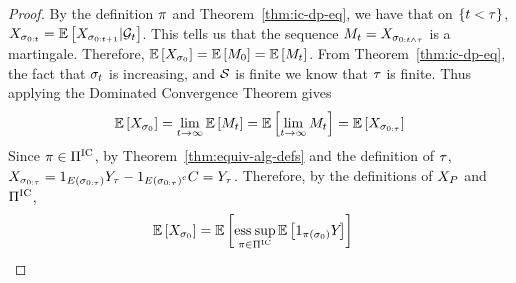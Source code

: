 \begin{proof}
    By the definition $\pi$
    and Theorem~\ref{thm:ic-dp-eq},
    we have that on $\left\{t <\tau\right\}$,
    \(
        X_{
            \sigma_{0:t}
        }
        =
        \mathbb{E}\left[
            X_{
                \sigma_{0:t+1}
            }
            | \mathcal{G}_{t}
        \right]
    \). 
    This tells us that the sequence
    \(
        M_t
        =
        X_{
            \sigma_{0:t\wedge\tau}
        }
    \)
    is a martingale. Therefore,
    \(
        \mathbb{E}\left[
            X_{
                \sigma_{0}
            }
        \right]
        =
        \mathbb{E}\left[M_0\right]
        =
        \mathbb{E}\left[M_t\right]
    \).
    From Theorem~\ref{thm:ic-dp-eq}, the fact that $\sigma_{t}$ is increasing, and $\mathcal{S}$ is finite
    we know that $\tau$ is finite. Thus applying the Dominated Convergence Theorem gives 
    \[
        \mathbb{E}\left[
            X_{
                \sigma_{0}
            }
        \right]
        =
        \lim_{t\rightarrow\infty}
        \mathbb{E}\left[
            M_t
        \right]
        =
        \mathbb{E}\left[
            \lim_{t\rightarrow\infty}
            M_t
        \right]
        =
        \mathbb{E}\left[
            X_{
                \sigma_{0:\tau}
            }
        \right]
    \]
    Since $\pi\in\Pi^{\text{IC}}$,
    by Theorem~\ref{thm:equiv-alg-defs} and the definition of $\tau$,
    \(
        X_{
            \sigma_{0:\tau}
        }
        =
        1_{
            E\left(
                \sigma_{0:\tau}
            \right)
        }
        Y_{\tau}
        -
        1_{
            E\left(
                \sigma_{0:\tau}
            \right)^c
        }
        C
        =
        Y_{\tau}
    \).
    Therefore, by the definitions of $X_{P}$ and $\Pi^{\text{IC}}$,
    \begin{align*}
        \mathbb{E}\left[
            X_{\sigma_{0}}
        \right]
        &=
        \mathbb{E}\left[
            \operatorname*{ess\hspace{0.08cm}sup}_{
                \pi\in\Pi^{\text{IC}}
            }
            \mathbb{E}\left[
                1_{
                    \pi\left(\sigma_{0}\right)
                }
                Y_{
}\right]\right]
\end{align*}
\end{proof}
